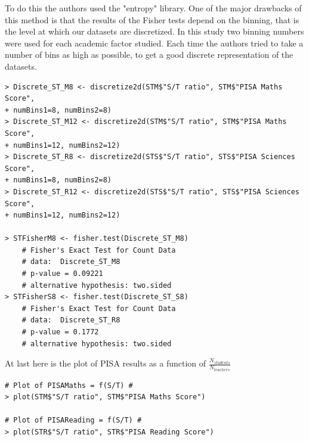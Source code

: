 \documentclass[12pt,a4paper]{article}
\begin{document}
To do this the authors used the "entropy" library. One of the major drawbacks of this method is that the results of the Fisher tests depend on the binning, that is the level at which our datasets are discretized.
In this study two binning numbers were used for each academic factor studied. Each time the authors tried to take a number of bins as high as possible, to get a good discrete representation of the datasets.
\begin{lstlisting}
> Discrete_ST_M8 <- discretize2d(STM$"S/T ratio", STM$"PISA Maths Score",
+ numBins1=8, numBins2=8)
> Discrete_ST_M12 <- discretize2d(STM$"S/T ratio", STM$"PISA Maths Score",
+ numBins1=12, numBins2=12)
> Discrete_ST_R8 <- discretize2d(STS$"S/T ratio", STS$"PISA Sciences Score",
+ numBins1=8, numBins2=8)
> Discrete_ST_R12 <- discretize2d(STS$"S/T ratio", STS$"PISA Sciences Score",
+ numBins1=12, numBins2=12)

> STFisherM8 <- fisher.test(Discrete_ST_M8)
	# Fisher's Exact Test for Count Data
	# data:  Discrete_ST_M8
	# p-value = 0.09221
	# alternative hypothesis: two.sided
> STFisherS8 <- fisher.test(Discrete_ST_S8)
	# Fisher's Exact Test for Count Data
	# data:  Discrete_ST_R8
	# p-value = 0.1772
	# alternative hypothesis: two.sided
\end{lstlisting}
At last here is the plot of PISA results as a function of $\frac{N_{students}}{N_{teachers}}$
\begin{lstlisting}	
# Plot of PISAMaths = f(S/T) #
> plot(STM$"S/T ratio", STM$"PISA Maths Score")

# Plot of PISAReading = f(S/T) #
> plot(STR$"S/T ratio", STR$"PISA Reading Score")
\end{lstlisting}
\end{document}
